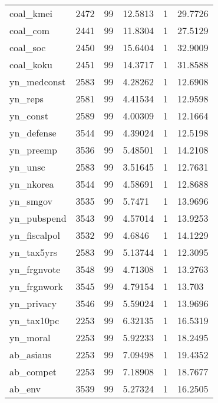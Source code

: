 \begin{tabular}{llllll}
coal\_kmei     &  2472 &         99 &   12.5813 &        1 &   29.7726 \\
coal\_com      &  2441 &         99 &   11.8304 &        1 &   27.5129 \\
coal\_soc      &  2450 &         99 &   15.6404 &        1 &   32.9009 \\
coal\_koku     &  2451 &         99 &   14.3717 &        1 &   31.8588 \\
yn\_medconst   &  2583 &         99 &   4.28262 &        1 &   12.6908 \\
yn\_reps       &  2581 &         99 &   4.41534 &        1 &   12.9598 \\
yn\_const      &  2589 &         99 &   4.00309 &        1 &   12.1664 \\
yn\_defense    &  3544 &         99 &   4.39024 &        1 &   12.5198 \\
yn\_preemp     &  3536 &         99 &   5.48501 &        1 &   14.2108 \\
yn\_unsc       &  2583 &         99 &   3.51645 &        1 &   12.7631 \\
yn\_nkorea     &  3544 &         99 &   4.58691 &        1 &   12.8688 \\
yn\_smgov      &  3535 &         99 &    5.7471 &        1 &   13.9696 \\
yn\_pubspend   &  3543 &         99 &   4.57014 &        1 &   13.9253 \\
yn\_fiscalpol  &  3532 &         99 &    4.6846 &        1 &   14.1229 \\
yn\_tax5yrs    &  2583 &         99 &   5.13744 &        1 &   12.3095 \\
yn\_frgnvote   &  3548 &         99 &   4.71308 &        1 &   13.2763 \\
yn\_frgnwork   &  3545 &         99 &   4.79154 &        1 &    13.703 \\
yn\_privacy    &  3546 &         99 &   5.59024 &        1 &   13.9696 \\
yn\_tax10pc    &  2253 &         99 &   6.32135 &        1 &   16.5319 \\
yn\_moral      &  2253 &         99 &   5.92233 &        1 &   18.2495 \\
ab\_asiaus     &  2253 &         99 &   7.09498 &        1 &   19.4352 \\
ab\_compet     &  2253 &         99 &   7.18908 &        1 &   18.7677 \\
ab\_env        &  3539 &         99 &   5.27324 &        1 &   16.2505 \\

\end{tabular}
